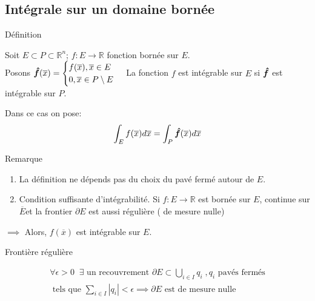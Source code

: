 \subsection{Intégrale sur un domaine bornée}
\begin{parag}{Définition}
    \begin{definition}
        Soit $E \subset P \subset \mathbb{R}^{n}$; $f: E \to \mathbb{R}$ fonction bornée sur $E$.\\
        Posons $\bhat{f}\left(\overline{x}\right) =  \begin{cases} f\left(\overline{x}\right), \overline{x} \in E\\ 0, \overline{x} \in P \setminus E \end{cases}$ La fonction $f$ est intégrable sur $E$ si $\bm{\hat{f}}$ est intégrable sur $P$.
    \end{definition}
    Dans ce cas on pose: 
    \begin{align*} \int_E f\left(\overline{x}\right) d\overline{x} =  \int_P \bhat{f}\left(\overline{x}\right) d\overline{x} \end{align*}
\end{parag}
\begin{parag}{Remarque}
    \begin{enumerate}
        \item La définition ne dépends pas du choix du pavé fermé autour de $E$.
        \item Condition suffisante d'intégrabilité. Si $f : E \to \mathbb{R}$ est bornée sur $E$, continue sur $\overline{E}$et la frontier $\partial E$ est aussi régulière ( de mesure nulle)
    \end{enumerate}
    $\implies $ Alors, $f\left(\overline{x}\right)$ est intégrable sur $E$.
    \begin{subparag}{Frontière régulière}
         \begin{definition}
            \begin{align*} 
                \forall \epsilon > 0\; \; \exists \text{ un recouvrement } \partial E \subset \bigcup_{i \in I}q_i\; , q_i \text{ pavés fermés} \\\text{ tels que } \sum_{i \in I}\left|q_i\right| < \epsilon
                \implies \partial E \text{ est de mesure nulle }
            \end{align*}
         \end{definition}
    \end{subparag}
    
\end{parag}


